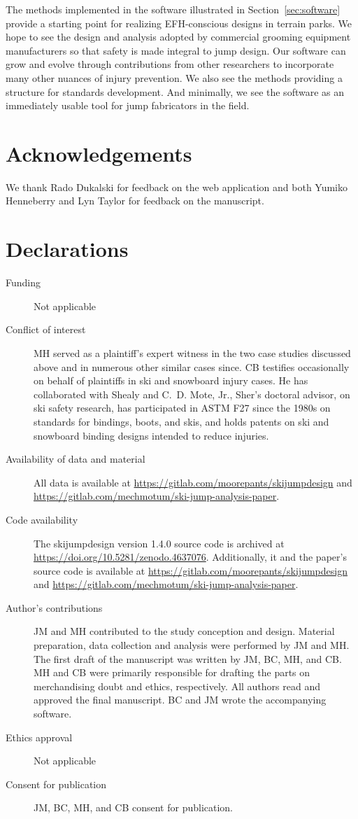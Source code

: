 \documentclass{article}
\begin{document}
The methods implemented in the software illustrated in
Section~\ref{sec:software} provide a starting point for realizing EFH-conscious
designs in terrain parks. We hope to see the design and analysis adopted by
commercial grooming equipment manufacturers so that safety is made integral to
jump design. Our software can grow and evolve through contributions from other
researchers to incorporate many other nuances of injury prevention. We also see
the methods providing a structure for standards development. And minimally, we
see the software as an immediately usable tool for jump fabricators in the
field.

\section*{Acknowledgements}
We thank Rado Dukalski for feedback on the web application and both Yumiko
Henneberry and Lyn Taylor for feedback on the manuscript.

\section*{Declarations}
\begin{description}
  \item[Funding] Not applicable
  \item[Conflict of interest] MH served as a plaintiff's expert witness in the
    two case studies discussed above and in numerous other similar cases since.
    CB testifies occasionally on behalf of plaintiffs in ski and snowboard
    injury cases. He has collaborated with Shealy and C.~D. Mote, Jr., Sher's
    doctoral advisor, on ski safety research, has participated in ASTM F27
    since the 1980s on standards for bindings, boots, and skis, and holds
    patents on ski and snowboard binding designs intended to reduce injuries.
  \item[Availability of data and material] All data is available at
    \url{https://gitlab.com/moorepants/skijumpdesign} and
    \url{https://gitlab.com/mechmotum/ski-jump-analysis-paper}.
  \item[Code availability] The skijumpdesign version 1.4.0 source code is
    archived at \url{https://doi.org/10.5281/zenodo.4637076}. Additionally, it
    and the paper's source code is available at
    \url{https://gitlab.com/moorepants/skijumpdesign} and
    \url{https://gitlab.com/mechmotum/ski-jump-analysis-paper}.
  \item[Author's contributions] JM and MH contributed to the study conception
    and design. Material preparation, data collection and analysis were
    performed by JM and MH. The first draft of the manuscript was written by
    JM, BC, MH, and CB. MH and CB were primarily responsible for drafting
    the parts on merchandising doubt and ethics, respectively. All authors read
    and approved the final manuscript. BC and JM wrote the accompanying
    software.
  \item[Ethics approval] Not applicable
  \item[Consent for publication] JM, BC, MH, and CB consent for publication.
\end{description}


\end{document}
